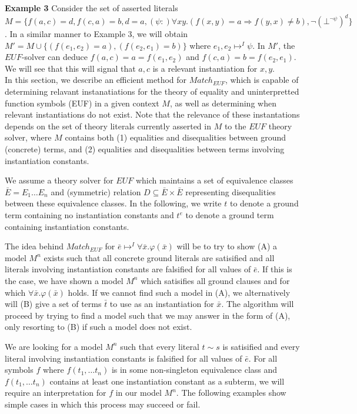 \documentclass{llncs}
\begin{document}
{\bf Example 3}
Consider the set of asserted literals $M = \{ f( a, c ) = d, f( c, a ) = b, d = a, (\psi :) \forall xy. (f( x, y ) = a \Rightarrow f( y, x ) \neq b), \neg ( \bot^{\neg \psi} )^d \}$.
In a similar manner to Example 3, we will obtain $M' = M \cup \{ (f( e_1, e_2 ) = a), (f( e_2, e_1 ) = b) \}$ where $e_1, e_2 \mapsto^I \psi$.
In $M'$, the $EUF$-solver can deduce $f( a, c ) = a = f( e_1, e_2 )$ and $f( c, a ) = b = f( e_2, e_1 )$.
We will see that this will signal that $a, c$ is a relevant instantiation for $x, y$. \\

In this section, we describe an efficient method for $Match_{EUF}$, which is capable of determining relavant instanatiations for the theory of equality and uninterpretted function symbols (EUF) in a given context $M$, as well as determining when relevant instantiations do not exist.
Note that the relevance of these instantations depends on the set of theory literals currently asserted in $M$ to the $EUF$ theory solver, where $M$ contains both (1) equalities and disequalities between ground (concrete) terms, and (2) equalities and disequalities between terms involving instantiation constants.

We assume a theory solver for $EUF$ which maintains a set of equivalence classes $\bar{E} = E_1 \ldots E_n$ and (symmetric) relation $D \subseteq \bar{E} \times \bar{E}$ representing disequalities between these equivalence classes.  
In the following, we write $t$ to denote a ground term containing no instantiation constants and $t^e$ to denote a ground term containing instantiation constants.

The idea behind $Match_{EUF}$ for $\bar{e} \mapsto^I \forall \bar{x}. \varphi( \bar{x} )$ will be to try to show (A) a model $M^n$ exists such that all concrete ground literals are satisified and all literals involving instantiation constants are falsified for all values of $\bar{e}$.
If this is the case, we have shown a model $M^n$ which satisifies all ground clauses and for which $\forall \bar{x}. \varphi( \bar{x} )$ holds.
If we cannot find such a model in (A), we alternatively will (B) give a set of terms $\bar{t}$ to use as an instantiation for $\bar{x}$.
The algorithm will proceed by trying to find a model such that we may answer in the form of (A), only resorting to (B) if such a model does not exist.

We are looking for a model $M^n$ such that every literal $t \sim s$ is satisified and every literal involving instantiation constants is falsified for all values of $\bar{e}$.
For all symbols $f$ where $f( t_1, \ldots t_n )$ is in some non-singleton equivalence class and $f( t_1, \ldots t_n )$ contains at least one instantiation constant as a subterm, we will require an interpretation for $f$ in our model $M^n$.
The following examples show simple cases in which this process may succeed or fail. \\
\end{document}
